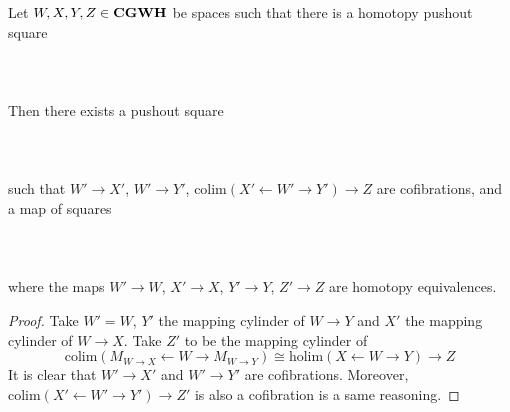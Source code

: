 \documentclass[a4paper]{article}
\begin{document}
\begin{prp}{}{} Let $W,X,Y,Z\in\bold{CGWH}$ be spaces such that there is a homotopy pushout square \\~\\
\\~\\
Then there exists a pushout square \\~\\
\\~\\
such that $W'\to X'$, $W'\to Y'$, $\text{colim}(X'\leftarrow W'\rightarrow Y')\to Z$ are cofibrations, and a map of squares \\~\\
\\~\\
where the maps $W'\to W$, $X'\to X$, $Y'\to Y$, $Z'\to Z$ are homotopy equivalences. \tcbline
\begin{proof}
Take $W'=W$, $Y'$ the mapping cylinder of $W\to Y$ and $X'$ the mapping cylinder of $W\to X$. Take $Z'$ to be the mapping cylinder of $$\text{colim}(M_{W\to X}\leftarrow W\rightarrow M_{W\to Y})\cong\text{holim}(X\leftarrow W\rightarrow Y)\to Z$$ It is clear that $W'\to X'$ and $W'\to Y'$ are cofibrations. Moreover, $\text{colim}(X'\leftarrow W'\rightarrow Y')\to Z'$ is also a cofibration is a same reasoning. 
\end{proof}
\end{prp}
\end{document}
